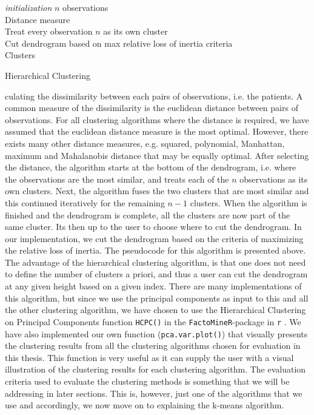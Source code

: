 \documentclass[../thesis.tex]{subfiles}
\begin{document}
\begin{algorithm}[H]{
\SetAlgoLined
\textit{initialization}\;
\hspace*{0,5cm}$n$ observations\\
\hspace*{0,5cm}Distance measure\\
\hspace*{0,5cm}Treat every observation $n$ as its own cluster\\
}
Cut dendrogram based on max relative loss of inertia criteria\\
\Return Clusters
\caption{Hierarchical Clustering}
\end{algorithm}
\newpage
\noindent culating the dissimilarity between each pairs of observations, i.e. the patients. A common measure of the dissimilarity is the euclidean distance between pairs of observations. For all clustering algorithms where the distance is required, we have assumed that the euclidean distance measure is the most optimal. However, there exists many other distance measures, e.g. squared, polynomial, Manhattan, maximum and Mahalanobis distance that may be equally optimal. After selecting the distance, the algorithm starts at the bottom of the dendrogram, i.e. where the observations are the most similar, and treats each of the $n$ observations as its own clusters. Next, the algorithm fuses the two clusters that are most similar and this continued iteratively for the remaining $n - 1$ clusters. When the algorithm is finished and the dendrogram is complete, all the clusters are now part of the same cluster. Its then up to the user to choose where to cut the dendrogram. In our implementation, we cut the dendrogram based on the criteria of maximizing the relative loss of inertia. The pseudocode for this algorithm is presented above.\\
\indent The advantage of the hierarchical clustering algorithm, is that one does not need to define the number of clusters a priori, and thus a user can cut the dendrogram at any given height based on a given index. There are many implementations of this algorithm, but since we use the principal components as input to this and all the other clustering algorithm, we have chosen to use the Hierarchical Clustering on Principal Components function \texttt{HCPC()} in the \texttt{FactoMineR}-package in \texttt{r} \citep{FactoMineR}. We have also implemented our own function (\texttt{pca.var.plot()}) that visually presents the clustering results from all the clustering algorithms chosen for evaluation in this thesis. This function is very useful as it can supply the user with a visual illustration of the clustering results for each clustering algorithm. The evaluation criteria used to evaluate the clustering methods is something that we will be addressing in later sections. This is, however, just one of the algorithms that we use and accordingly, we now move on to explaining the k-means algorithm.
\end{document}
